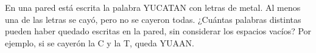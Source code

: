 En una pared está escrita la palabra YUCATAN con letras de metal. Al menos una de las letras se cayó, pero no se cayeron todas. ¿Cuántas palabras distintas pueden haber quedado escritas en la pared, sin considerar los espacios vacíos? Por ejemplo, si se cayerón la C y la T, queda YUAAN.
